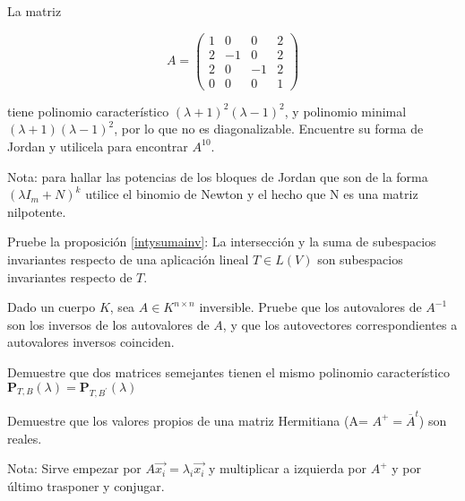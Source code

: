 \begin{exercise} 
\item
La matriz

\bigskip

\[A=\left(\begin{array}{cccc}1 & 0 & 0 &2  \\ 2& -1 & 0
& 2\\ 2  & 0 & -1 &  2\\0 & 0 & 0 & 1                         
\end{array}
 \right)
\]

\bigskip

\noindent  tiene polinomio característico $(\lambda+1)^2(\lambda-1)^2$, y polinomio minimal $(\lambda+1)(\lambda-1)^2$, por lo que no es diagonalizable.
Encuentre su forma de Jordan y utilicela para encontrar $A^{10}$.

\bigskip


\noindent Nota: para hallar las potencias de los bloques de Jordan que son de la forma $(\lambda I_m +N)^k$ utilice el binomio de Newton y el hecho que N es una matriz nilpotente.

\end{exercise} 

 
\bigskip

\begin{exercise} 
\item

 Pruebe la proposición \ref{intysumainv}:
\noindent
La intersección y la suma de subespacios invariantes respecto de una aplicación lineal $T\in L(V)$ son subespacios invariantes respecto de $T$.

\end{exercise} 
\begin{exercise} 
\item

Dado un cuerpo $K$, sea $A \in K^{n\times n}$ inversible. Pruebe que los autovalores de $A^{-1}$ son los inversos de los autovalores de $A$, y que los autovectores correspondientes a autovalores inversos coinciden.
\end{exercise} 

\begin{exercise} 
\item
Demuestre que  dos matrices semejantes tienen  el mismo polinomio característico
$\mathbf{P}_{T,B}(\lambda)=\mathbf{P}_{T,B^{\prime}}(\lambda)$
\end{exercise} 
\begin{exercise} 
\item
Demuestre que los valores propios de una matriz Hermitiana (A= $A^{+}=\overline A ^t$) son reales.

\bigskip

Nota: Sirve empezar
por $A\vec{x_i}=\lambda_i \vec{x_i}$ y multiplicar a izquierda por $A^{+}$ y por último trasponer y conjugar. 
\end{exercise} 

